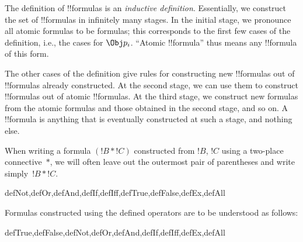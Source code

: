 \documentclass[../../../include/open-logic-section]{subfiles}
\begin{document}
\begin{explain}
The definition of !!{formula}s is an
\emph{inductive definition}.  Essentially, we construct the set of
!!{formula}s in infinitely many stages.  In the initial stage, we
pronounce all atomic formulas to be formulas; this corresponds to the
first few cases of the definition, i.e., the cases for
%
%
$\Obj p_i$.  ``Atomic !!{formula}''
thus means any !!{formula} of this form.

The other cases of the definition give rules for constructing new
!!{formula}s out of !!{formula}s already constructed.  At the second
stage, we can use them to construct !!{formula}s out of atomic
!!{formula}s.  At the third stage, we construct new formulas from the
atomic formulas and those obtained in the second stage, and so on.  A
!!{formula} is anything that is eventually constructed at such a
stage, and nothing else.
\end{explain}

When writing a formula $(!B \ast !C)$ constructed from $!B$, $!C$
using a two-place connective~$\ast$, we will often leave out the
outermost pair of parentheses and write simply~$!B \ast !C$.

\begin{tagblock}{defNot,defOr,defAnd,defIf,defIff,defTrue,defFalse,defEx,defAll}
\begin{defn}
Formulas constructed using the defined operators are to be understood
as follows:

\begin{tagenumerate}{defTrue,defFalse,defNot,defOr,defAnd,defIf,defIff,defEx,defAll}







\end{tagenumerate}
\end{defn}
\end{tagblock}
\end{document}
